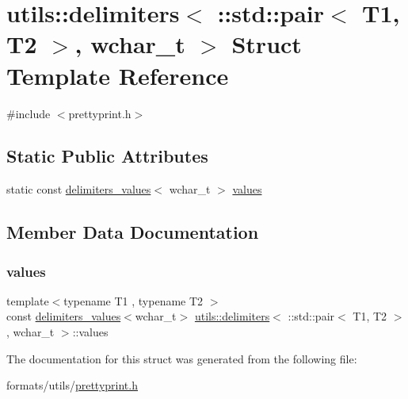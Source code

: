 \hypertarget{structutils_1_1delimiters_3_01_1_1std_1_1pair_3_01_t1_00_01_t2_01_4_00_01wchar__t_01_4}{}\section{utils\+::delimiters$<$ \+::std\+::pair$<$ T1, T2 $>$, wchar\+\_\+t $>$ Struct Template Reference}
\label{structutils_1_1delimiters_3_01_1_1std_1_1pair_3_01_t1_00_01_t2_01_4_00_01wchar__t_01_4}


{\ttfamily \#include $<$prettyprint.\+h$>$}

\subsection*{Static Public Attributes}
\begin{DoxyCompactItemize}
\item 
static const \mbox{\hyperlink{structutils_1_1delimiters__values}{delimiters\+\_\+values}}$<$ wchar\+\_\+t $>$ \mbox{\hyperlink{structutils_1_1delimiters_3_01_1_1std_1_1pair_3_01_t1_00_01_t2_01_4_00_01wchar__t_01_4_a00070dbe5989a91e1067784c1edc089f}{values}}
\end{DoxyCompactItemize}


\subsection{Member Data Documentation}
\mbox{\label{structutils_1_1delimiters_3_01_1_1std_1_1pair_3_01_t1_00_01_t2_01_4_00_01wchar__t_01_4_a00070dbe5989a91e1067784c1edc089f}} 
\subsubsection{\texorpdfstring{values}{values}}
{\footnotesize\ttfamily template$<$typename T1 , typename T2 $>$ \\
const \mbox{\hyperlink{structutils_1_1delimiters__values}{delimiters\+\_\+values}}$<$wchar\+\_\+t$>$ \mbox{\hyperlink{structutils_1_1delimiters}{utils\+::delimiters}}$<$ \+::std\+::pair$<$ T1, T2 $>$, wchar\+\_\+t $>$\+::values\hspace{0.3cm}{\ttfamily [static]}}



The documentation for this struct was generated from the following file\+:\begin{DoxyCompactItemize}
\item 
formats/utils/\mbox{\hyperlink{prettyprint_8h}{prettyprint.\+h}}\end{DoxyCompactItemize}
